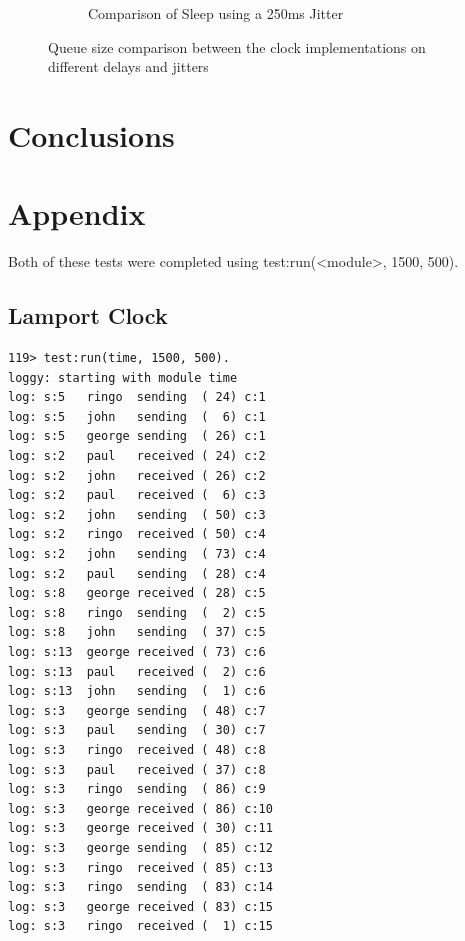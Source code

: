 \documentclass[a4paper, 11pt]{article}
\begin{document}
\begin{figure}[H]
\begin{center}
\begin{subfigure}[b]{0.494\textwidth}
      \caption{Comparison of Sleep using a 250ms Jitter}
      \label{fig:results2}
    \end{subfigure}
  \end{center}
  \caption{Queue size comparison between the clock implementations on different delays and jitters}
  \label{fig:comparison}
\end{figure}


\section{Conclusions}



\newpage
\section{Appendix}

Both of these tests were completed using test:run(<module>, 1500, 500).

\subsection{Lamport Clock}
\begin{verbatim}
119> test:run(time, 1500, 500).
loggy: starting with module time
log: s:5   ringo  sending  ( 24) c:1
log: s:5   john   sending  (  6) c:1
log: s:5   george sending  ( 26) c:1
log: s:2   paul   received ( 24) c:2
log: s:2   john   received ( 26) c:2
log: s:2   paul   received (  6) c:3
log: s:2   john   sending  ( 50) c:3
log: s:2   ringo  received ( 50) c:4
log: s:2   john   sending  ( 73) c:4
log: s:2   paul   sending  ( 28) c:4
log: s:8   george received ( 28) c:5
log: s:8   ringo  sending  (  2) c:5
log: s:8   john   sending  ( 37) c:5
log: s:13  george received ( 73) c:6
log: s:13  paul   received (  2) c:6
log: s:13  john   sending  (  1) c:6
log: s:3   george sending  ( 48) c:7
log: s:3   paul   sending  ( 30) c:7
log: s:3   ringo  received ( 48) c:8
log: s:3   paul   received ( 37) c:8
log: s:3   ringo  sending  ( 86) c:9
log: s:3   george received ( 86) c:10
log: s:3   george received ( 30) c:11
log: s:3   george sending  ( 85) c:12
log: s:3   ringo  received ( 85) c:13
log: s:3   ringo  sending  ( 83) c:14
log: s:3   george received ( 83) c:15
log: s:3   ringo  received (  1) c:15
\end{verbatim}
\end{document}
